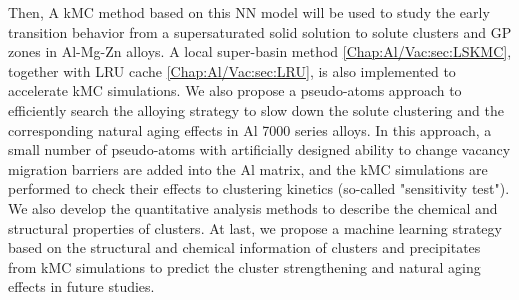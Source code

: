 Then, A \ac{kMC} method based on this \ac{NN} model will be used to study the early transition behavior from a supersaturated solid solution to solute clusters and \acf{GP} zones in Al-Mg-Zn alloys. A local super-basin method  \ref{Chap:Al/Vac:sec:LSKMC}, together with \ac{LRU} cache \ref{Chap:Al/Vac:sec:LRU}, is also implemented to accelerate \ac{kMC} simulations. We also propose a pseudo-atoms approach to efficiently search the alloying strategy to slow down the solute clustering and the corresponding natural aging effects in Al 7000 series alloys. In this approach, a small number of pseudo-atoms with artificially designed ability to change vacancy migration barriers are added into the Al matrix, and the \ac{kMC} simulations are performed to check their effects to clustering kinetics (so-called "sensitivity test"). We also develop the quantitative analysis methods to describe the chemical and structural properties of clusters. At last, we propose a machine learning strategy based on the structural and chemical information of clusters and precipitates from \ac{kMC} simulations to predict the cluster strengthening and natural aging effects in future studies.